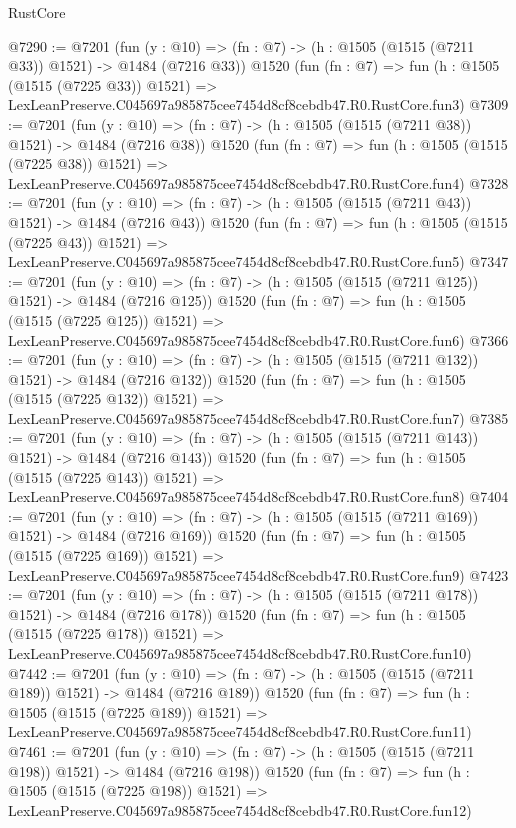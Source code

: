 \begin{lexlean}{RustCore}
\begin{coremodule}
@7290 := @7201
    (fun (y : @10) => (fn : @7) -> (h : @1505 (@1515 (@7211 @33)) @1521) -> @1484 (@7216 @33))
    @1520
    (fun (fn : @7) =>
    fun (h : @1505 (@1515 (@7225 @33)) @1521) =>
    LexLeanPreserve.C045697a985875cee7454d8cf8cebdb47.R0.RustCore.fun3)
@7309 := @7201
    (fun (y : @10) => (fn : @7) -> (h : @1505 (@1515 (@7211 @38)) @1521) -> @1484 (@7216 @38))
    @1520
    (fun (fn : @7) =>
    fun (h : @1505 (@1515 (@7225 @38)) @1521) =>
    LexLeanPreserve.C045697a985875cee7454d8cf8cebdb47.R0.RustCore.fun4)
@7328 := @7201
    (fun (y : @10) => (fn : @7) -> (h : @1505 (@1515 (@7211 @43)) @1521) -> @1484 (@7216 @43))
    @1520
    (fun (fn : @7) =>
    fun (h : @1505 (@1515 (@7225 @43)) @1521) =>
    LexLeanPreserve.C045697a985875cee7454d8cf8cebdb47.R0.RustCore.fun5)
@7347 := @7201
    (fun (y : @10) => (fn : @7) -> (h : @1505 (@1515 (@7211 @125)) @1521) -> @1484 (@7216 @125))
    @1520
    (fun (fn : @7) =>
    fun (h : @1505 (@1515 (@7225 @125)) @1521) =>
    LexLeanPreserve.C045697a985875cee7454d8cf8cebdb47.R0.RustCore.fun6)
@7366 := @7201
    (fun (y : @10) => (fn : @7) -> (h : @1505 (@1515 (@7211 @132)) @1521) -> @1484 (@7216 @132))
    @1520
    (fun (fn : @7) =>
    fun (h : @1505 (@1515 (@7225 @132)) @1521) =>
    LexLeanPreserve.C045697a985875cee7454d8cf8cebdb47.R0.RustCore.fun7)
@7385 := @7201
    (fun (y : @10) => (fn : @7) -> (h : @1505 (@1515 (@7211 @143)) @1521) -> @1484 (@7216 @143))
    @1520
    (fun (fn : @7) =>
    fun (h : @1505 (@1515 (@7225 @143)) @1521) =>
    LexLeanPreserve.C045697a985875cee7454d8cf8cebdb47.R0.RustCore.fun8)
@7404 := @7201
    (fun (y : @10) => (fn : @7) -> (h : @1505 (@1515 (@7211 @169)) @1521) -> @1484 (@7216 @169))
    @1520
    (fun (fn : @7) =>
    fun (h : @1505 (@1515 (@7225 @169)) @1521) =>
    LexLeanPreserve.C045697a985875cee7454d8cf8cebdb47.R0.RustCore.fun9)
@7423 := @7201
    (fun (y : @10) => (fn : @7) -> (h : @1505 (@1515 (@7211 @178)) @1521) -> @1484 (@7216 @178))
    @1520
    (fun (fn : @7) =>
    fun (h : @1505 (@1515 (@7225 @178)) @1521) =>
    LexLeanPreserve.C045697a985875cee7454d8cf8cebdb47.R0.RustCore.fun10)
@7442 := @7201
    (fun (y : @10) => (fn : @7) -> (h : @1505 (@1515 (@7211 @189)) @1521) -> @1484 (@7216 @189))
    @1520
    (fun (fn : @7) =>
    fun (h : @1505 (@1515 (@7225 @189)) @1521) =>
    LexLeanPreserve.C045697a985875cee7454d8cf8cebdb47.R0.RustCore.fun11)
@7461 := @7201
    (fun (y : @10) => (fn : @7) -> (h : @1505 (@1515 (@7211 @198)) @1521) -> @1484 (@7216 @198))
    @1520
    (fun (fn : @7) =>
    fun (h : @1505 (@1515 (@7225 @198)) @1521) =>
    LexLeanPreserve.C045697a985875cee7454d8cf8cebdb47.R0.RustCore.fun12)

\end{coremodule}
\end{lexlean}
